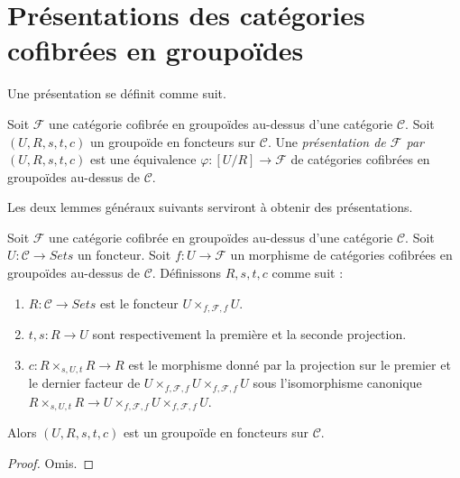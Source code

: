 \section{Présentations des catégories cofibrées en groupoïdes}
\label{section-presentation-categories-cofibred-in-groupoids}

\noindent
Une présentation se définit comme suit.

\begin{definition}
\label{definition-presentation}
Soit $\mathcal{F}$ une catégorie cofibrée en groupoïdes au-dessus d'une
catégorie $\mathcal{C}$. Soit $(U, R, s, t, c)$ un groupoïde en foncteurs sur
$\mathcal{C}$. Une {\it présentation de $\mathcal{F}$ par
$(U, R, s, t, c)$} est une équivalence
$\varphi : [U/R] \to \mathcal{F}$ de catégories cofibrées en groupoïdes
au-dessus de $\mathcal{C}$.
\end{definition}

\noindent
Les deux lemmes généraux suivants serviront à obtenir des présentations.

\begin{lemma}
\label{lemma-presentation-construction}
Soit $\mathcal{F}$ une catégorie cofibrée en groupoïdes au-dessus d'une
catégorie $\mathcal{C}$. Soit $U : \mathcal{C} \to \textit{Sets}$ un
foncteur. Soit $f : U \to \mathcal{F}$ un morphisme de catégories cofibrées
en groupoïdes au-dessus de $\mathcal{C}$. Définissons $R, s, t, c$ comme suit :
\begin{enumerate}
\item $R : \mathcal{C} \to \textit{Sets}$ est le foncteur
$U \times_{f, \mathcal{F}, f} U$.
\item $t, s : R \to U$ sont respectivement la première et la seconde
projection.
\item $c : R \times_{s, U, t} R \to R$ est le morphisme donné par la
projection sur le premier et le dernier facteur de
$U \times_{f, \mathcal{F}, f} U \times_{f, \mathcal{F}, f} U$
sous l'isomorphisme canonique
$R \times_{s, U, t} R \to
U \times_{f, \mathcal{F}, f} U \times_{f, \mathcal{F}, f} U$.
\end{enumerate}
Alors $(U, R, s, t, c)$ est un groupoïde en foncteurs sur $\mathcal{C}$.
\end{lemma}

\begin{proof}
Omis.
\end{proof}

